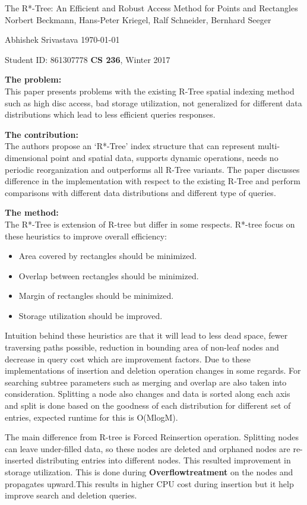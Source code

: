 \documentclass[a4paper,12pt, twoside]{article}
\renewcommand{\maketitle}{%
 	\Large
 	\begin{center}
 	The R*-Tree: An Efficient and Robust Access Method for Points and Rectangles\\	
 	\normalsize Norbert Beckmann, Hans-Peter Kriegel, Ralf Schneider, Bernhard Seeger
 	\end{center}
 
 	\Large
	Abhishek Srivastava
	\hfill
	\normalsize
	\today
 	\par
 	Student ID: 861307778
 	\hfill
 	\textbf{CS 236}, Winter 2017
 	\par 	
 	\hrulefill
 	\par
 	}
\begin{document}
\thispagestyle{empty}
	
\maketitle

\textbf{The problem:}\\
This paper presents problems with the existing R-Tree spatial indexing method such as high disc access, bad storage utilization, not generalized for different data distributions which lead to less efficient queries responses.

\textbf{The contribution:}\\
The authors propose an `R*-Tree' index structure that can represent multi-dimensional point and spatial data, supports dynamic operations, needs no periodic reorganization and outperforms all R-Tree variants. The paper discusses difference in the implementation with respect to the existing R-Tree and perform comparisons with different data distributions and different type of queries. 

\textbf{The method:}\\
The R*-Tree is extension of R-tree but differ in some respects.
R*-tree focus on these heuristics to improve overall efficiency:
\begin{itemize}
	\item Area covered by rectangles should be minimized.
	\item Overlap between rectangles should be minimized.
	\item Margin of rectangles should be minimized.
	\item Storage utilization should be improved. 
\end{itemize}

Intuition behind these heuristics are that it will lead to less dead space, fewer traversing paths possible, reduction in bounding area of non-leaf nodes and decrease in query cost which are improvement factors. Due to these implementations of insertion and deletion operation changes in some regards. For searching subtree parameters such as merging and overlap are also taken into consideration. Splitting a node also changes and data is sorted along each axis and split is done based on the goodness of each distribution for different set of entries, expected runtime for this is O(MlogM).  

The main difference from R-tree is Forced Reinsertion operation. Splitting nodes can leave under-filled data, so these nodes are deleted and orphaned nodes are re-inserted distributing entries into different nodes. This resulted improvement in storage utilization. This is done during \textbf{Overflowtreatment} on the nodes and propagates upward.This results in higher CPU cost during insertion but it help improve search and deletion queries. 
\end{document}
